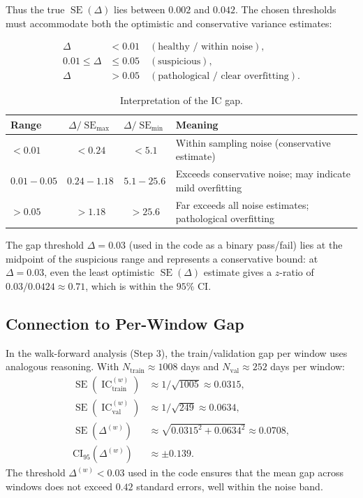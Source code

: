 \documentclass[11pt,a4paper]{article}
\theoremstyle{definition}
\newcommand{\IC}{\operatorname{IC}}
\newcommand{\SE}{\operatorname{SE}}
\begin{document}
Thus the true $\SE(\Delta)$ lies between $0.002$ and $0.042$.  The chosen
thresholds must accommodate both the optimistic and conservative variance
estimates:

\begin{align}
    \Delta &< 0.01 \quad (\text{healthy / within noise}), \\
    0.01 \leq \Delta &\leq 0.05 \quad (\text{suspicious}), \\
    \Delta &> 0.05 \quad (\text{pathological / clear overfitting}).
\end{align}

\begin{table}[htbp]
\centering
\caption{Interpretation of the IC gap.}
\label{tab:gap}
\begin{tabular}{lccl}
\toprule
Range & $\Delta/\SE_{\text{max}}$ & $\Delta/\SE_{\text{min}}$ & Meaning \\
\midrule
$< 0.01$ & $< 0.24$ & $< 5.1$ & Within sampling noise (conservative estimate) \\
$0.01{-}0.05$ & $0.24{-}1.18$ & $5.1{-}25.6$ & Exceeds conservative noise; may indicate mild overfitting \\
$> 0.05$ & $> 1.18$ & $> 25.6$ & Far exceeds all noise estimates; pathological overfitting \\
\bottomrule
\end{tabular}
\end{table}

The gap threshold $\Delta = 0.03$ (used in the code as a binary pass/fail)
lies at the midpoint of the suspicious range and represents a conservative
bound: at $\Delta = 0.03$, even the least optimistic $\SE(\Delta)$ estimate
gives a $z$-ratio of $0.03/0.0424 \approx 0.71$, which is within the
$95\%$ CI.

\subsection{Connection to Per-Window Gap}

In the walk-forward analysis (Step 3), the train/validation gap per window
uses analogous reasoning.  With $N_{\text{train}} \approx 1008$ days and
$N_{\text{val}} \approx 252$ days per window:
\begin{align}
    \SE(\IC_{\text{train}}^{(w)}) &\approx 1/\sqrt{1005} \approx 0.0315, \\
    \SE(\IC_{\text{val}}^{(w)})   &\approx 1/\sqrt{249}  \approx 0.0634, \\
    \SE(\Delta^{(w)}) &\approx \sqrt{0.0315^2 + 0.0634^2} \approx 0.0708, \\
    \text{CI}_{95}(\Delta^{(w)}) &\approx \pm 0.139.
\end{align}
The threshold $\Delta^{(w)} < 0.03$ used in the code ensures that the mean
gap across windows does not exceed $0.42$ standard errors, well within the
noise band.
\end{document}
